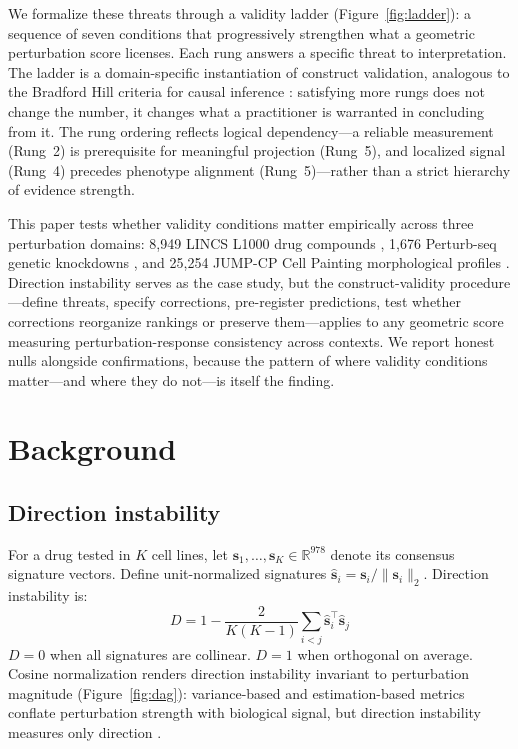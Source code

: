 \documentclass[10pt]{article}
\begin{document}
We formalize these threats through a validity ladder
(Figure~\ref{fig:ladder}): a sequence of seven conditions that
progressively strengthen what a geometric perturbation score licenses.
Each rung answers a specific threat to interpretation. The ladder is a
domain-specific instantiation of construct validation, analogous to the
Bradford Hill criteria for causal inference
\citep{freiesleben2025benchmarking}: satisfying more rungs does not change
the number, it changes what a practitioner is warranted in concluding
from it. The rung ordering reflects logical dependency---a reliable
measurement (Rung~2) is prerequisite for meaningful projection (Rung~5),
and localized signal (Rung~4) precedes phenotype alignment (Rung~5)---rather
than a strict hierarchy of evidence strength.

This paper tests whether validity conditions matter empirically across three
perturbation domains: 8{,}949 LINCS L1000 drug compounds
\citep{subramanian2017next}, 1{,}676 Perturb-seq genetic knockdowns
\citep{replogle2022mapping}, and 25{,}254 JUMP-CP Cell Painting morphological
profiles \citep{chandrasekaran2023jump}. Direction instability serves as
the case study, but the construct-validity procedure---define threats,
specify corrections, pre-register predictions, test whether corrections
reorganize rankings or preserve them---applies to any geometric score
measuring perturbation-response consistency across contexts. We report
honest nulls alongside confirmations, because the pattern of where
validity conditions matter---and where they do not---is itself the finding.

\section{Background}

\subsection{Direction instability}

For a drug tested in $K$ cell lines, let $\mathbf{s}_1, \ldots,
\mathbf{s}_K \in \mathbb{R}^{978}$ denote its consensus signature vectors.
Define unit-normalized signatures $\hat{\mathbf{s}}_i = \mathbf{s}_i /
\|\mathbf{s}_i\|_2$. Direction instability is:
\begin{equation}
  D = 1 - \frac{2}{K(K-1)} \sum_{i < j}
    \hat{\mathbf{s}}_i^\top \hat{\mathbf{s}}_j
  \label{eq:direction_instability}
\end{equation}
$D = 0$ when all signatures are collinear. $D = 1$ when orthogonal on average.
Cosine normalization renders direction instability invariant to perturbation
magnitude (Figure~\ref{fig:dag}): variance-based and estimation-based metrics
conflate perturbation strength with biological signal, but direction
instability measures only direction \citep{tower2026drug}.
\end{document}
